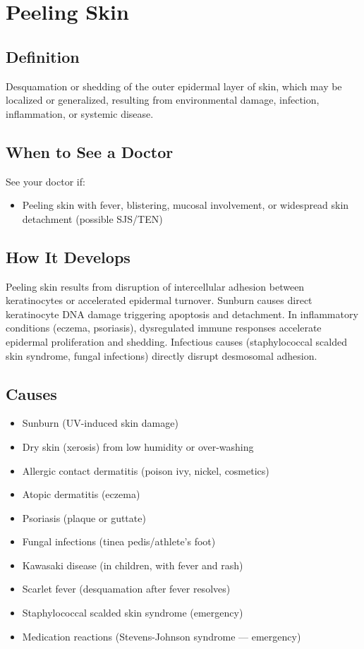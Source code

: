 \chapter{Peeling Skin}

\section*{Definition}
Desquamation or shedding of the outer epidermal layer of skin, which may be localized or generalized, resulting from environmental damage, infection, inflammation, or systemic disease.

\section*{When to See a Doctor}
See your doctor if:
\begin{itemize}
  \item Peeling skin with fever, blistering, mucosal involvement, or widespread skin detachment (possible SJS/TEN)
\end{itemize}

\section*{How It Develops}
Peeling skin results from disruption of intercellular adhesion between keratinocytes or accelerated epidermal turnover. Sunburn causes direct keratinocyte DNA damage triggering apoptosis and detachment. In inflammatory conditions (eczema, psoriasis), dysregulated immune responses accelerate epidermal proliferation and shedding. Infectious causes (staphylococcal scalded skin syndrome, fungal infections) directly disrupt desmosomal adhesion.

\section*{Causes}
\begin{itemize}
  \item Sunburn (UV-induced skin damage)
  \item Dry skin (xerosis) from low humidity or over-washing
  \item Allergic contact dermatitis (poison ivy, nickel, cosmetics)
  \item Atopic dermatitis (eczema)
  \item Psoriasis (plaque or guttate)
  \item Fungal infections (tinea pedis/athlete's foot)
  \item Kawasaki disease (in children, with fever and rash)
  \item Scarlet fever (desquamation after fever resolves)
  \item Staphylococcal scalded skin syndrome (emergency)
  \item Medication reactions (Stevens-Johnson syndrome — emergency)
\end{itemize}

